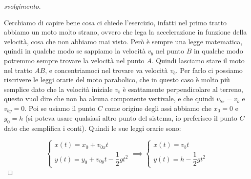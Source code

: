 \documentclass{rapport}
\begin{document}
\begin{proof}[svolgimento]
\begin{figure}[htbp]
\end{figure}

Cerchiamo di capire bene cosa ci chiede l'esercizio, infatti nel primo tratto abbiamo un moto molto strano, ovvero che lega la accelerazione in funzione della velocità, cosa che non abbiamo mai visto. Però è sempre una legge matematica, quindi in qualche modo se sappiamo la velocità $v_b$ nel punto $B$ in qualche modo potremmo sempre trovare la velocità nel punto $A$. Quindi lasciamo stare il moto nel tratto $AB$, e concentriamoci nel trovare va velocità $v_b$. Per farlo ci possiamo riscrivere le leggi orarie del moto parabolico, che in questo caso è molto più semplice dato che la velocità iniziale $v_b$ è esattamente perpendicolare al terreno, questo vuol dire che non ha alcuna componente vertivale, e che quindi $v_{bx} = v_b$ e $v_{by} = 0$. Poi se usiamo il punto $C$ come origine degli assi abbiamo che $x_0 = 0$ e $y_0 = h$ (si poteva usare qualsiasi altro punto del sistema, io preferisco il punto $C$ dato che semplifica i conti). Quindi le sue leggi orarie sono:

\[
\begin{cases}
  x(t) = x_0 + v_{0x} t\\
  y(t) = y_0 + v_{0y} t - \dfrac{1}{2}gt^2
\end{cases} \implies
\begin{cases}
  x(t) =   v_{b} t\\
  y(t) = h - \dfrac{1}{2}gt^2
\end{cases} 
\]


\end{proof}
\end{document}
